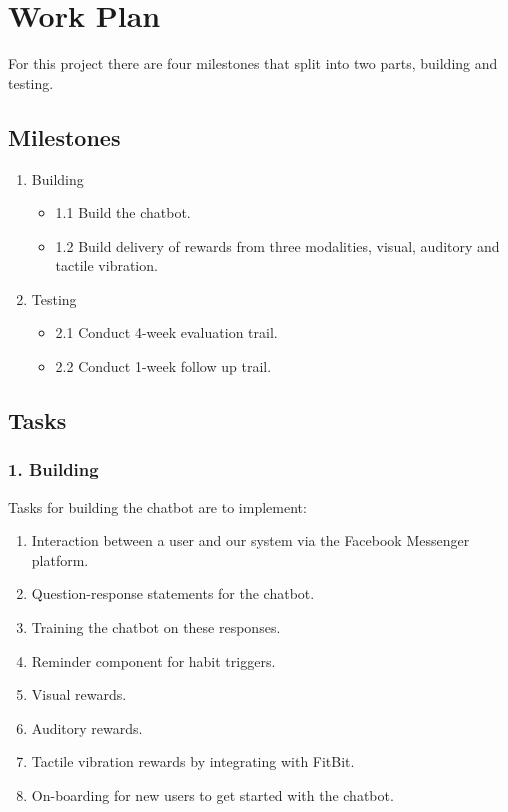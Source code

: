 
\newpage
\section{Work Plan}
For this project there are four milestones that split into two parts, building and testing.


\subsection{Milestones}

\begin{enumerate}
  \item Building
  \begin{itemize}
    \item 1.1 Build the chatbot.
    \item 1.2 Build delivery of rewards from three modalities, visual, auditory and tactile vibration.
  \end{itemize}
  \item Testing
  \begin{itemize}
    \item 2.1 Conduct 4-week evaluation trail.
    \item 2.2 Conduct 1-week follow up trail.
  \end{itemize}
\end{enumerate}

\subsection{Tasks}

\subsubsection*{1. Building}
Tasks for building the chatbot are to implement:

\begin{enumerate}
  \item Interaction between a user and our system via the Facebook Messenger platform.
  \item Question-response statements for the chatbot.
  \item Training the chatbot on these responses.
  \item Reminder component for habit triggers.
  \item Visual rewards.
  \item Auditory rewards.
  \item Tactile vibration rewards by integrating with FitBit.
  \item On-boarding for new users to get started with the chatbot.
\end{enumerate}

